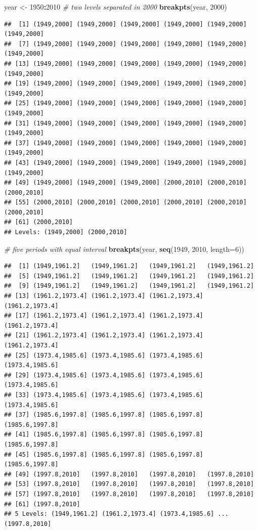 \documentclass[
]{book}
\newenvironment{Shaded}{\begin{snugshade}}{\end{snugshade}}
\newcommand{\AttributeTok}[1]{\textcolor[rgb]{0.13,0.29,0.53}{#1}}
\newcommand{\CommentTok}[1]{\textcolor[rgb]{0.56,0.35,0.01}{\textit{#1}}}
\newcommand{\DecValTok}[1]{\textcolor[rgb]{0.00,0.00,0.81}{#1}}
\newcommand{\FunctionTok}[1]{\textcolor[rgb]{0.13,0.29,0.53}{\textbf{#1}}}
\newcommand{\NormalTok}[1]{#1}
\newcommand{\OtherTok}[1]{\textcolor[rgb]{0.56,0.35,0.01}{#1}}
\newcommand{\SpecialCharTok}[1]{\textcolor[rgb]{0.81,0.36,0.00}{\textbf{#1}}}
\begin{document}
\begin{Shaded}
\begin{Highlighting}[]
\NormalTok{year }\OtherTok{\textless{}{-}} \DecValTok{1950}\SpecialCharTok{:}\DecValTok{2010}
\CommentTok{\# two levels separated in 2000}
\FunctionTok{breakpts}\NormalTok{(year, }\DecValTok{2000}\NormalTok{)}
\end{Highlighting}
\end{Shaded}

\begin{verbatim}
##  [1] (1949,2000] (1949,2000] (1949,2000] (1949,2000] (1949,2000] (1949,2000]
##  [7] (1949,2000] (1949,2000] (1949,2000] (1949,2000] (1949,2000] (1949,2000]
## [13] (1949,2000] (1949,2000] (1949,2000] (1949,2000] (1949,2000] (1949,2000]
## [19] (1949,2000] (1949,2000] (1949,2000] (1949,2000] (1949,2000] (1949,2000]
## [25] (1949,2000] (1949,2000] (1949,2000] (1949,2000] (1949,2000] (1949,2000]
## [31] (1949,2000] (1949,2000] (1949,2000] (1949,2000] (1949,2000] (1949,2000]
## [37] (1949,2000] (1949,2000] (1949,2000] (1949,2000] (1949,2000] (1949,2000]
## [43] (1949,2000] (1949,2000] (1949,2000] (1949,2000] (1949,2000] (1949,2000]
## [49] (1949,2000] (1949,2000] (1949,2000] (2000,2010] (2000,2010] (2000,2010]
## [55] (2000,2010] (2000,2010] (2000,2010] (2000,2010] (2000,2010] (2000,2010]
## [61] (2000,2010]
## Levels: (1949,2000] (2000,2010]
\end{verbatim}

\begin{Shaded}
\begin{Highlighting}[]
\CommentTok{\# five periods with equal interval}
\FunctionTok{breakpts}\NormalTok{(year, }\FunctionTok{seq}\NormalTok{(}\DecValTok{1949}\NormalTok{, }\DecValTok{2010}\NormalTok{, }\AttributeTok{length=}\DecValTok{6}\NormalTok{))}
\end{Highlighting}
\end{Shaded}

\begin{verbatim}
##  [1] (1949,1961.2]   (1949,1961.2]   (1949,1961.2]   (1949,1961.2]  
##  [5] (1949,1961.2]   (1949,1961.2]   (1949,1961.2]   (1949,1961.2]  
##  [9] (1949,1961.2]   (1949,1961.2]   (1949,1961.2]   (1949,1961.2]  
## [13] (1961.2,1973.4] (1961.2,1973.4] (1961.2,1973.4] (1961.2,1973.4]
## [17] (1961.2,1973.4] (1961.2,1973.4] (1961.2,1973.4] (1961.2,1973.4]
## [21] (1961.2,1973.4] (1961.2,1973.4] (1961.2,1973.4] (1961.2,1973.4]
## [25] (1973.4,1985.6] (1973.4,1985.6] (1973.4,1985.6] (1973.4,1985.6]
## [29] (1973.4,1985.6] (1973.4,1985.6] (1973.4,1985.6] (1973.4,1985.6]
## [33] (1973.4,1985.6] (1973.4,1985.6] (1973.4,1985.6] (1973.4,1985.6]
## [37] (1985.6,1997.8] (1985.6,1997.8] (1985.6,1997.8] (1985.6,1997.8]
## [41] (1985.6,1997.8] (1985.6,1997.8] (1985.6,1997.8] (1985.6,1997.8]
## [45] (1985.6,1997.8] (1985.6,1997.8] (1985.6,1997.8] (1985.6,1997.8]
## [49] (1997.8,2010]   (1997.8,2010]   (1997.8,2010]   (1997.8,2010]  
## [53] (1997.8,2010]   (1997.8,2010]   (1997.8,2010]   (1997.8,2010]  
## [57] (1997.8,2010]   (1997.8,2010]   (1997.8,2010]   (1997.8,2010]  
## [61] (1997.8,2010]  
## 5 Levels: (1949,1961.2] (1961.2,1973.4] (1973.4,1985.6] ... (1997.8,2010]
\end{verbatim}
\end{document}

